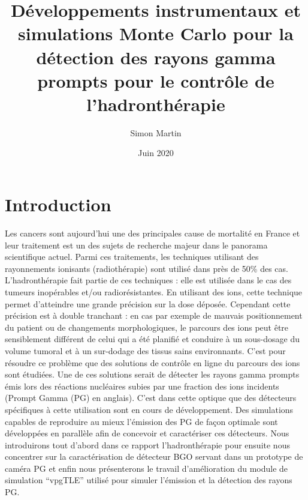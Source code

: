\documentclass[11pt,a4paper,oldfontcommands]{memoir}
\begin{document}
\title{Développements instrumentaux et simulations Monte Carlo pour la détection des rayons gamma prompts pour le contrôle de l’hadronthérapie}
\author{Simon Martin}
\date{Juin 2020}



\maketitle
\newpage
\tableofcontents
\openany
\chapter{Introduction}
Les cancers sont aujourd'hui une des principales cause de mortalité en France et leur traitement est un des sujets de recherche majeur dans le panorama scientifique actuel. Parmi ces traitements, les techniques utilisant des rayonnements ionisants (radiothérapie) sont utilisé dans près de 50\% des cas. L'hadronthérapie fait partie de ces techniques : elle est utilisée dans le cas des tumeurs inopérables et/ou radiorésistantes. En utilisant des ions, cette technique permet d'atteindre une grande précision sur la dose déposée. Cependant cette précision est à double tranchant : en cas par exemple de mauvais positionnement du patient ou de changements morphologiques, le parcours des ions peut être sensiblement différent de celui qui a été planifié et conduire à un sous-dosage du volume tumoral et à un sur-dodage des tissus sains environnants. C'est pour résoudre ce problème que des solutions de contrôle en ligne du parcours des ions sont étudiées. Une de ces solutions serait de détecter les rayons gamma prompts émis lors des réactions nucléaires subies par une fraction des ions incidents (Prompt Gamma (PG) en anglais). C'est dans cette optique que des détecteurs spécifiques à cette utilisation sont en cours de développement. Des simulations capables de reproduire au mieux l'émission des PG de façon optimale sont développées en parallèle afin de concevoir et caractériser ces détecteurs. Nous introduirons tout d'abord dans ce rapport l'hadronthérapie pour ensuite nous concentrer sur la caractérisation de détecteur BGO servant dans un prototype de caméra PG et enfin nous présenterons le travail d'amélioration du module de simulation \enquote{vpgTLE} utilisé pour simuler l'émission et la détection des rayons PG.

\openany
\end{document}
